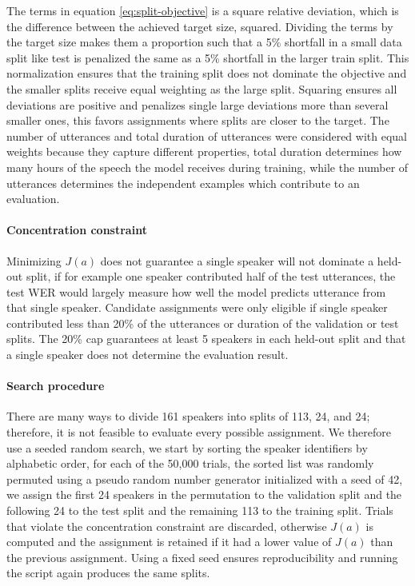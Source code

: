 {The terms in equation \eqref{eq:split-objective} is a square relative deviation, which is the difference between the achieved target size, squared. Dividing the terms by the target size makes them a proportion such that a 5\% shortfall in a small data split like test is penalized the same as a 5\% shortfall in the larger train split. This normalization ensures that the training split does not dominate the objective and the smaller splits receive equal weighting as the large split. Squaring ensures all deviations are positive and penalizes single large deviations more than several smaller ones, this favors assignments where splits are closer to the target. The number of utterances and total duration of utterances were considered with equal weights because they capture different properties, total duration determines how many hours of the speech the model receives during training, while the number of utterances determines the independent examples which contribute to an evaluation. 

\paragraph{Concentration constraint}
  Minimizing $J(a)$ does not guarantee a single speaker will not dominate a held-out split, if for example one speaker contributed half of the test utterances, the test WER would largely measure how well the model predicts utterance from that single speaker. Candidate assignments were only eligible if single speaker contributed less than 20\% of the utterances or duration of the validation or test splits. The 20\% cap guarantees at least 5 speakers in each held-out split and that a single speaker does not determine the evaluation result. 

\paragraph{Search procedure}
  There are many ways to divide 161 speakers into splits of 113, 24, and 24; therefore, it is not feasible to evaluate every possible assignment. We therefore use a seeded random search, we start by sorting the speaker identifiers by alphabetic order, for each of the 50,000 trials, the sorted list was randomly permuted using a pseudo random number generator initialized with a seed of 42, we assign the first 24 speakers in the permutation to the validation split and the following 24 to the test split and the remaining 113 to the training split. Trials that violate the concentration constraint are discarded, otherwise $J(a)$ is computed and the assignment is retained if it had a lower value of $J(a)$ than the previous assignment. Using a fixed seed ensures reproducibility and running the script again produces the same splits.

}
